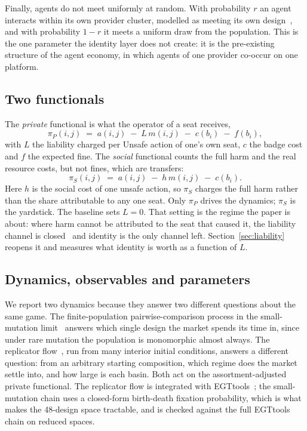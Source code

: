 \documentclass[11pt,a4paper]{article}
\theoremstyle{definition}
\newcommand{\piP}{\pi_{P}}
\newcommand{\piS}{\pi_{S}}
\begin{document}
Finally, agents do not meet uniformly at random. With probability $r$ an agent
interacts within its own provider cluster, modelled as meeting its own
design~\citep{grafen1979hawk},
and with probability $1 - r$ it meets a uniform draw from the population. This
is the one parameter the identity layer does not create: it is the pre-existing
structure of the agent economy, in which agents of one provider co-occur on one
platform.

\subsection{Two functionals}
\label{sec:functionals}

The \emph{private} functional is what the operator of a seat receives,
\begin{equation}
\label{eq:private}
\piP(i, j) \;=\; a(i, j) \;-\; L\, m(i, j) \;-\; c(b_i) \;-\; f(b_i),
\end{equation}
with $L$ the liability charged per Unsafe action of one's own seat, $c$ the
badge cost and $f$ the expected fine. The \emph{social} functional counts the
full harm and the real resource costs, but not fines, which are transfers:
\begin{equation}
\label{eq:social}
\piS(i, j) \;=\; a(i, j) \;-\; h\, m(i, j) \;-\; c(b_i).
\end{equation}
Here $h$ is the social cost of one unsafe action, so $\piS$ charges the full
harm rather than the share attributable to any one seat.
Only $\piP$ drives the dynamics; $\piS$ is the yardstick. The baseline sets
$L = 0$. That setting is the regime the paper is about: where harm cannot be
attributed to the seat that caused it, the liability channel is
closed~\citep{chan2024visibility,kolt2025governing} and identity is the only
channel left. Section~\ref{sec:liability} reopens it and measures what
identity is worth as a function of $L$.

\subsection{Dynamics, observables and parameters}
\label{sec:dynamics}

We report two dynamics because they answer two different questions about the
same game. The finite-population pairwise-comparison process in the
small-mutation limit~\citep{fudenberg2006imitation,traulsen2006stochastic}
answers which single design the market spends its time in, since under rare
mutation the population is monomorphic almost always. The replicator
flow~\citep{taylor1978ess,hofbauer1998evolutionary}, run from many interior
initial conditions, answers a different question: from an arbitrary starting
composition, which regime does the market settle into, and how large is each
basin. Both act on the assortment-adjusted private functional. The replicator
flow is integrated with EGTtools~\citep{domingos2023egttools}; the
small-mutation chain uses a closed-form birth-death fixation probability,
which is what makes the 48-design space tractable, and is checked against the
full EGTtools chain on reduced spaces.
\end{document}
